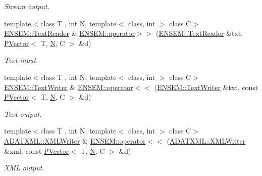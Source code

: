 \begin{DoxyCompactItemize}
\begin{DoxyCompactList}\small\item\em Stream output. \end{DoxyCompactList}\item 
{\footnotesize template$<$class T , int N, template$<$ class, int $>$ class C$>$ }\\\mbox{\hyperlink{classENSEM_1_1TextReader}{E\+N\+S\+E\+M\+::\+Text\+Reader}} \& \mbox{\hyperlink{group__primvector_gae8999766af04f54e1142ab8717a7f742}{E\+N\+S\+E\+M\+::operator$>$$>$}} (\mbox{\hyperlink{classENSEM_1_1TextReader}{E\+N\+S\+E\+M\+::\+Text\+Reader}} \&txt, \mbox{\hyperlink{classENSEM_1_1PVector}{P\+Vector}}$<$ T, \mbox{\hyperlink{operator__name__util_8cc_a7722c8ecbb62d99aee7ce68b1752f337}{N}}, C $>$ \&d)
\begin{DoxyCompactList}\small\item\em Text input. \end{DoxyCompactList}\item 
{\footnotesize template$<$class T , int N, template$<$ class, int $>$ class C$>$ }\\\mbox{\hyperlink{classENSEM_1_1TextWriter}{E\+N\+S\+E\+M\+::\+Text\+Writer}} \& \mbox{\hyperlink{group__primvector_gad4763d04d040319fe22a95ca0e2b8932}{E\+N\+S\+E\+M\+::operator$<$$<$}} (\mbox{\hyperlink{classENSEM_1_1TextWriter}{E\+N\+S\+E\+M\+::\+Text\+Writer}} \&txt, const \mbox{\hyperlink{classENSEM_1_1PVector}{P\+Vector}}$<$ T, \mbox{\hyperlink{operator__name__util_8cc_a7722c8ecbb62d99aee7ce68b1752f337}{N}}, C $>$ \&d)
\begin{DoxyCompactList}\small\item\em Text output. \end{DoxyCompactList}\item 
{\footnotesize template$<$class T , int N, template$<$ class, int $>$ class C$>$ }\\\mbox{\hyperlink{classADATXML_1_1XMLWriter}{A\+D\+A\+T\+X\+M\+L\+::\+X\+M\+L\+Writer}} \& \mbox{\hyperlink{group__primvector_ga5f643f72b00ff82d7abfb2a42401c045}{E\+N\+S\+E\+M\+::operator$<$$<$}} (\mbox{\hyperlink{classADATXML_1_1XMLWriter}{A\+D\+A\+T\+X\+M\+L\+::\+X\+M\+L\+Writer}} \&xml, const \mbox{\hyperlink{classENSEM_1_1PVector}{P\+Vector}}$<$ T, \mbox{\hyperlink{operator__name__util_8cc_a7722c8ecbb62d99aee7ce68b1752f337}{N}}, C $>$ \&d)
\begin{DoxyCompactList}\small\item\em X\+ML output. \end{DoxyCompactList}\item 

\end{DoxyCompactItemize}
